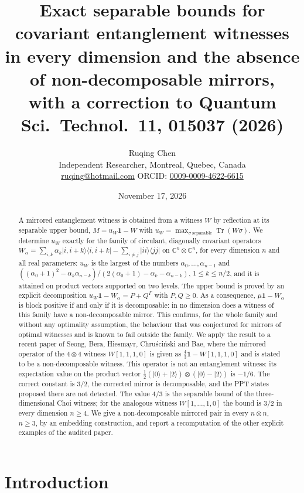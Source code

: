 \documentclass[11pt,a4paper]{article}
\title{Exact separable bounds for covariant entanglement witnesses\\
in every dimension and the absence of non-decomposable mirrors,\\
with a correction to Quantum Sci.\ Technol.\ 11, 015037 (2026)}
\author{Ruqing Chen\\[2pt]
\small Independent Researcher, Montreal, Quebec, Canada\\
\small \href{mailto:ruqing@hotmail.com}{ruqing@hotmail.com}\quad
ORCID: \href{https://orcid.org/0009-0009-4622-6615}{0009-0009-4622-6615}}
\date{November 17, 2026}
\theoremstyle{remark}
\newcommand{\ket}[1]{\lvert #1\rangle}
\newcommand{\ketbra}[2]{\lvert #1\rangle\langle #2\rvert}
\newcommand{\id}{\mathbf{1}}
\newcommand{\tr}{\operatorname{Tr}}
\newcommand{\G}{\Gamma}
\newcommand{\uW}{u_W}
\begin{document}
\maketitle

\begin{abstract}
A mirrored entanglement witness is obtained from a witness $W$ by reflection at its
separable upper bound, $M=\uW\id-W$ with $\uW=\max_{\sigma\ \mathrm{separable}}\tr(W\sigma)$.
We determine $\uW$ exactly for the family of circulant, diagonally covariant operators
$W_\alpha=\sum_{i,k}\alpha_k\ketbra{i,i+k}{i,i+k}-\sum_{i\neq j}\ketbra{ii}{jj}$ on
$\mathbb{C}^n\otimes\mathbb{C}^n$, for every dimension $n$ and all real parameters:
$\uW$ is the largest of the numbers $\alpha_0,\dots,\alpha_{n-1}$ and
$((\alpha_0+1)^2-\alpha_k\alpha_{n-k})/(2(\alpha_0+1)-\alpha_k-\alpha_{n-k})$,
$1\le k\le n/2$, and it is attained on product vectors supported on two levels. The upper
bound is proved by an explicit decomposition $\uW\id-W_\alpha=P+Q^{\G}$ with $P,Q\ge0$.
As a consequence, $\mu\id-W_\alpha$ is block positive if and only if it is decomposable:
in no dimension does a witness of this family have a non-decomposable mirror. This
confirms, for the whole family and without any optimality assumption, the behaviour that
was conjectured for mirrors of optimal witnesses and is known to fail outside the family.
We apply the result to a recent paper of Seong, Bera, Hiesmayr, Chru\'sci\'nski and Bae,
where the mirrored operator of the $4\otimes4$ witness $W[1,1,1,0]$ is given as
$\tfrac43\id-W[1,1,1,0]$ and is stated to be a non-decomposable witness. This operator is
not an entanglement witness: its expectation value on the product vector
$\tfrac12(\ket0+\ket2)\otimes(\ket0-\ket2)$ is $-1/6$. The correct constant is $3/2$, the
corrected mirror is decomposable, and the PPT states proposed there are not detected.
The value $4/3$ is the separable bound of the three-dimensional Choi witness; for the
analogous witness $W[1,\dots,1,0]$ the bound is $3/2$ in every dimension $n\ge4$. We give
a non-decomposable mirrored pair in every $n\otimes n$, $n\ge3$, by an embedding
construction, and report a recomputation of the other explicit examples of the audited
paper.
\end{abstract}

\section{Introduction}
\end{document}
